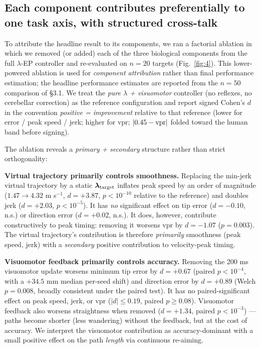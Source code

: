 \documentclass[sn-basic]{sn-jnl}
\begin{document}
\subsection{Each component contributes preferentially to one task
axis, with structured
cross-talk}

To attribute the headline result to its components, we ran a factorial
ablation in which we removed (or added) each of the three biological
components from the full $\lambda$-EP controller and re-evaluated on \(n = 20\)
targets (Fig.~\ref{fig:4}). This lower-powered ablation is used for
\emph{component attribution} rather than final performance estimation;
the headline performance estimates are reported from the \(n = 50\)
comparison of §3.1. We treat the \emph{pure $\lambda$ + visuomotor} controller
(no reflexes, no cerebellar correction) as the reference configuration
and report signed Cohen's \(d\) in the convention \emph{positive =
improvement} relative to that reference (lower for error / peak speed /
jerk; higher for vpr; \(|0.45 - {\rm vpr}|\) folded toward the human
band before signing).

The ablation reveals a \emph{primary + secondary} structure rather than
strict orthogonality:

\textbf{Virtual trajectory primarily controls smoothness.} Replacing the
min-jerk virtual trajectory by a static
\(\boldsymbol{\lambda}_{\rm target}\) inflates peak speed by an order of
magnitude (\(1.47 \to 4.32\) m s\(^{-1}\), \(d = +3.87\),
\(p < 10^{-10}\) relative to the reference) and doubles jerk
(\(d = +2.03\), \(p < 10^{-5}\)). It has \emph{no} significant effect on
tip error (\(d = -0.10\), n.s.) or direction error (\(d = +0.02\),
n.s.). It does, however, contribute constructively to peak timing:
removing it worsens vpr by \(d = -1.07\) (\(p = 0.003\)). The virtual
trajectory's contribution is therefore \emph{primarily} smoothness (peak
speed, jerk) with a \emph{secondary} positive contribution to
velocity-peak timing.

\textbf{Visuomotor feedback primarily controls accuracy.} Removing the
200 ms visuomotor update worsens minimum tip error by \(d = +0.67\)
(paired \(p < 10^{-4}\), with a \(+34.5\) mm median per-seed shift) and
direction error by \(d = +0.89\) (Welch \(p = 0.008\), broadly
consistent under the paired test). It has no paired-significant effect
on peak speed, jerk, or vpr (\(|d| \le 0.19\), paired \(p \ge 0.08\)).
Visuomotor feedback also worsens straightness when removed
(\(d = +1.34\), paired \(p < 10^{-3}\)) --- paths become shorter (less
wandering) without the feedback, but at the cost of accuracy. We
interpret the visuomotor contribution as accuracy-dominant with a small
positive effect on the path \emph{length} via continuous re-aiming.
\end{document}
